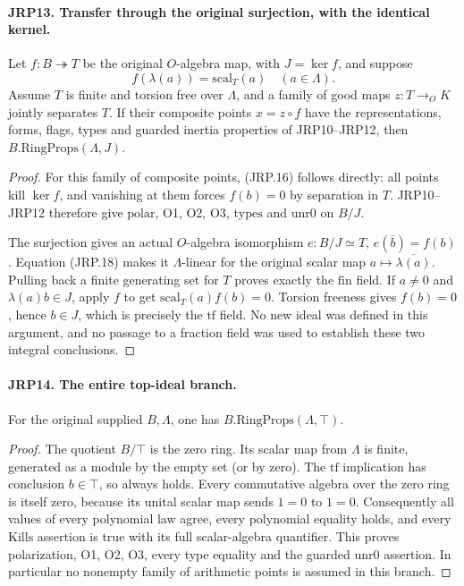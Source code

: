 \paragraph{JRP13. Transfer through the original surjection, with the identical kernel.}
\label{claim:JRP13}
Let \(f:B\twoheadrightarrow T\) be the original
\(O\)-algebra map, with \(J=\ker f\), and suppose
\[
                   f(\lambda(a))=\mathrm{scal}_T(a)
                                  \quad(a\in\Lambda).
 \tag{JRP.18}
\]
Assume \(T\) is finite and torsion free over \(\Lambda\),
and a family of good maps \(z:T\to_O K\) jointly separates
\(T\).  If their composite points \(x=z\circ f\) have the
representations, forms, flags, types and guarded inertia properties
of JRP10--JRP12, then \(B.\mathrm{RingProps}(\Lambda,J)\).
\begin{proof}
For this family of composite points, (JRP.16) follows directly:
all points kill \(\ker f\), and vanishing at them forces
\(f(b)=0\) by separation in \(T\).  JRP10--JRP12 therefore
give \(\mathrm{polar}\), O1, O2, O3,
\(\mathrm{types}\) and \(\mathrm{unr0}\) on \(B/J\).

The surjection gives an actual \(O\)-algebra isomorphism
\(e:B/J\simeq T\), \(e(\bar b)=f(b)\).
Equation (JRP.18) makes it \(\Lambda\)-linear for the
original scalar map \(a\mapsto\overline{\lambda(a)}\).
Pulling back a finite generating set for \(T\) proves exactly
the \(\mathrm{fin}\) field.  If \(a\ne0\) and
\(\lambda(a)b\in J\), apply \(f\) to get
\(\mathrm{scal}_T(a)f(b)=0\).  Torsion freeness gives
\(f(b)=0\), hence \(b\in J\), which is precisely
the \(\mathrm{tf}\) field.  No new ideal was defined in this
argument, and no passage to a fraction field was used to establish
these two integral conclusions.
\end{proof}

\paragraph{JRP14. The entire top-ideal branch.}
\label{claim:JRP14}
\leavevmode\par
For the original supplied \(B,\Lambda\), one has
\(B.\mathrm{RingProps}(\Lambda,\top)\).
\begin{proof}
The quotient \(B/\top\) is the zero ring.  Its scalar map from
\(\Lambda\) is finite, generated as a module by the empty set
(or by zero).  The \(\mathrm{tf}\) implication has conclusion
\(b\in\top\), so always holds.  Every commutative algebra over
the zero ring is itself zero, because its unital scalar map sends
\(1=0\) to \(1=0\).  Consequently all values of every
polynomial law agree, every polynomial equality holds, and every
\(\mathrm{Kills}\) assertion is true with its full scalar-algebra
quantifier.  This proves polarization, O1, O2, O3, every type
equality and the guarded \(\mathrm{unr0}\) assertion.  In
particular no nonempty family of arithmetic points is assumed in
this branch.
\end{proof}


